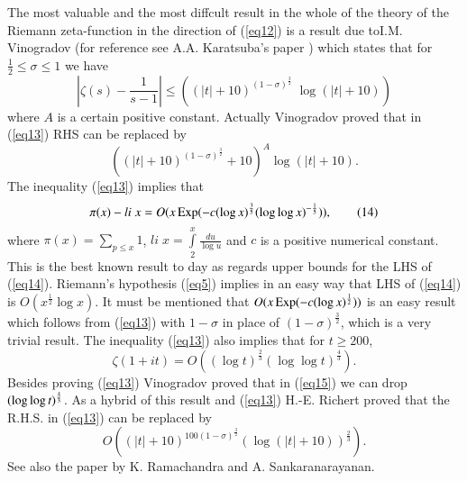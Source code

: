 \begin{remark}%
The most valuable and the most diffcult result in the whole of the theory of the Riemann zeta-function in the direction of (\ref{eq12}) is a result due to\pageoriginale I.M. Vinogradov (for reference see A.A. Karatsuba's paper \cite{Karatsuba1}) which states that for $\frac{1}{2} \leq \sigma \leq 1$ we have
\begin{equation*}
\left| \zeta(s) - \frac{1}{s-1} \right| \leq ((|t| + 10)^{(1-\sigma)^{\frac{3}{2}}} \;  \log  (|t| + 10)) \tag{13}\label{eq13}
\end{equation*}
where $A$ is a certain positive constant. Actually Vinogradov proved that in (\ref{eq13}) RHS can be replaced by
$$
\left( (|t| + 10)^{(1-\sigma)^{\frac{3}{2}}} + 10 \right)^A \log (|t| + 10).
$$
The inequality  (\ref{eq13}) implies that
\begin{equation*}
\pi (x) - li \; x = O (x \operatorname{Exp} (-c(\log x)^{\frac{3}{5}} (\log \log x)^{-\frac{1}{5}})), \tag{14}\label{eq14}
\end{equation*}
where $\pi (x) = \sum\limits_{p \leq x} 1$, $li \; x = \int\limits^x_2 \frac{du}{\log u}$ and $c$ is a positive numerical constant. This is the best known result to day as regards upper bounds for the LHS of (\ref{eq14}). Riemann's hypothesis (\ref{eq5}) implies in an easy way that LHS of (\ref{eq14}) is $O(x^{\frac{1}{2}} \log x)$. It must be mentioned that $O(x \operatorname{Exp} (-c (\log x)^{\frac{1}{2}}))$ is an easy result which follows from (\ref{eq13}) with $1 - \sigma$ in place of $(1-\sigma)^{\frac{3}{2}}$, which is a very trivial result. The inequality (\ref{eq13}) also implies that for $t \geq 200$,
\begin{equation*}
\zeta(1+ it) = O((\log t)^{\frac{2}{3}} (\log \log t)^{\frac{4}{3}}). 
\tag{15}\label{eq15}
\end{equation*}
Besides proving (\ref{eq13}) Vinogradov proved that in (\ref{eq15}) we
can drop $(\log\break\log t)^{\frac{4}{3}}$. As a hybrid of this result and
(\ref{eq13}) H.-E. Richert proved that the R.H.S. in (\ref{eq13}) can
be replaced by 
\begin{equation*}
O((|t| +10)^{100(1-\sigma)^{\frac{3}{2}}} (\log (|t| + 10))^{\frac{2}{3}}). \tag{16}\label{eq16}
\end{equation*}
See also the paper \cite{Ramachandra and Sankaranarayanan7} by K. Ramachandra and A. Sankaranarayanan.
\end{remark}

